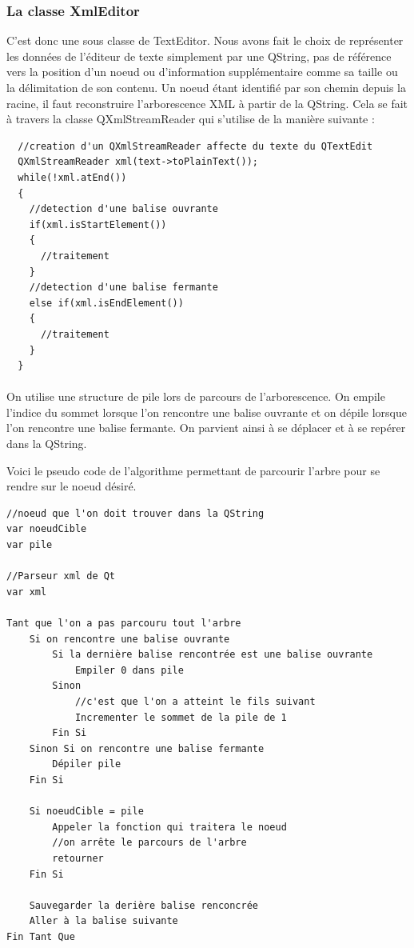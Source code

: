 \subsubsection{La classe XmlEditor}

C'est donc une sous classe de TextEditor. Nous avons fait le choix de représenter les données de l'éditeur de texte simplement par une QString, pas de référence vers la position d'un noeud ou d'information supplémentaire comme sa taille ou la délimitation de son contenu.
Un noeud étant identifié par son chemin depuis la racine, il faut reconstruire l'arborescence XML à partir de la QString. Cela se fait à travers la classe QXmlStreamReader qui s'utilise de la manière suivante :
\begin{lstlisting}
  //creation d'un QXmlStreamReader affecte du texte du QTextEdit
  QXmlStreamReader xml(text->toPlainText());
  while(!xml.atEnd())
  {
    //detection d'une balise ouvrante
    if(xml.isStartElement())
    {
      //traitement
    }
    //detection d'une balise fermante
    else if(xml.isEndElement())
    {
      //traitement
    }
  }
\end{lstlisting}
\paragraph{}
On utilise une structure de pile lors de parcours de l'arborescence. On empile l'indice du sommet lorsque l'on rencontre une balise ouvrante et on dépile lorsque l'on rencontre une balise fermante.
On parvient ainsi à se déplacer et à se repérer dans la QString.

Voici le pseudo code de l'algorithme permettant de parcourir l'arbre pour se rendre sur le noeud désiré.

\begin{verbatim}
//noeud que l'on doit trouver dans la QString
var noeudCible
var pile

//Parseur xml de Qt
var xml

Tant que l'on a pas parcouru tout l'arbre
    Si on rencontre une balise ouvrante
        Si la dernière balise rencontrée est une balise ouvrante
            Empiler 0 dans pile
        Sinon
            //c'est que l'on a atteint le fils suivant
            Incrementer le sommet de la pile de 1
        Fin Si
    Sinon Si on rencontre une balise fermante
        Dépiler pile
    Fin Si
    
    Si noeudCible = pile
        Appeler la fonction qui traitera le noeud
        //on arrête le parcours de l'arbre
        retourner
    Fin Si
   
    Sauvegarder la derière balise renconcrée
    Aller à la balise suivante
Fin Tant Que
\end{verbatim}

